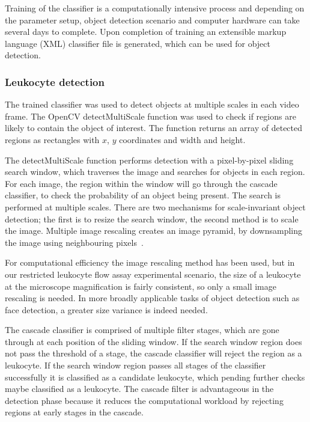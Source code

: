 Training of the classifier is a computationally intensive process and depending on the parameter setup, object detection scenario and computer hardware can take several days to complete. Upon completion of training an extensible markup language (XML) classifier file is generated, which can be used for object detection.

\subsubsection{Leukocyte detection}
The trained classifier was used to detect objects at multiple scales in each video frame. The OpenCV detectMultiScale function was used to check if regions are likely to contain the object of interest. The function returns an array of detected regions as rectangles with $x$, $y$ coordinates and width and height.

The detectMultiScale function performs detection with a pixel-by-pixel sliding search window, which traverses the image and searches for objects in each region. For each image, the region within the window will go through the cascade classifier, to check the probability of an object being present. The search is performed at multiple scales. There are two mechanisms for scale-invariant object detection; the first is to resize the search window, the second method is to scale the image. Multiple image rescaling creates an image pyramid, by downsampling the image using neighbouring pixels~\cite{Qiao2010}.

For computational efficiency the image rescaling method has been used, but in our restricted leukocyte flow assay experimental scenario, the size of a leukocyte at the microscope magnification is fairly consistent, so only a small image rescaling is needed. In more broadly applicable tasks of object detection such as face detection, a greater size variance is indeed needed.

The cascade classifier is comprised of multiple filter stages, which are gone through at each position of the sliding window. If the search window region does not pass the threshold of a stage, the cascade classifier will reject the region as a leukocyte. If the search window region passes all stages of the classifier successfully it is classified as a candidate leukocyte, which pending further checks maybe classified as a leukocyte. The cascade filter is advantageous in the detection phase because it reduces the computational workload by rejecting regions at early stages in the cascade.


